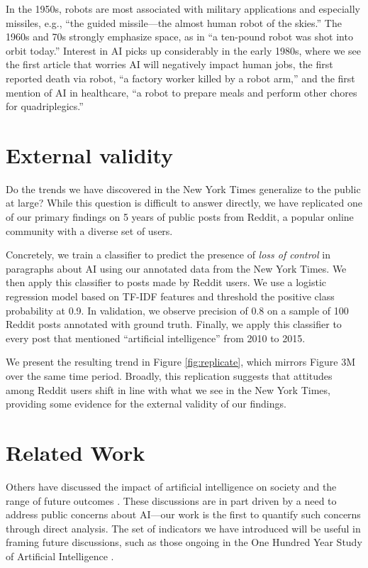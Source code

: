 \documentclass[letterpaper]{article}
\begin{document}
In the 1950s, robots are most associated with military applications and especially missiles, e.g., ``the guided missile---the almost human robot of the skies.'' The 1960s and 70s strongly emphasize space, as in ``a ten-pound robot was shot into orbit today.'' Interest in AI picks up considerably in the early 1980s, where we see the first article that worries AI will negatively impact human jobs, the first reported death via robot, ``a factory worker killed by a robot arm,'' and the first mention of AI in healthcare, ``a robot to prepare meals and perform other chores for quadriplegics.''

\vspace{-2.36mm}
\section{External validity}

Do the trends we have discovered in the New York Times generalize to the public at large? While this question is difficult to answer directly, we have replicated one of our primary findings on 5 years of public posts from Reddit, a popular online community with a diverse set of users.

Concretely, we train a classifier to predict the presence of \textit{loss of control} in paragraphs about AI using our annotated data from the New York Times. We then apply this classifier to posts made by Reddit users. We use a logistic regression model based on TF-IDF features and threshold the positive class probability at 0.9. In validation, we observe precision of 0.8 on a sample of 100 Reddit posts annotated with ground truth. Finally, we apply this classifier to every post that mentioned ``artificial intelligence'' from 2010 to 2015.

We present the resulting trend in Figure \ref{fig:replicate}, which mirrors Figure 3M over the same time period. Broadly, this replication suggests that attitudes among Reddit users shift in line with what we see in the New York Times, providing some evidence for the external validity of our findings.

\section{Related Work}

Others have discussed the impact of artificial intelligence on society and the range of future outcomes \cite{ai-concerns}. These discussions are in part driven by a need to address public concerns about AI---our work is the first to quantify such concerns through direct analysis. The set of indicators we have introduced will be useful in framing future discussions, such as those ongoing in the One Hundred Year Study of Artificial Intelligence \cite{100years}.
\end{document}

